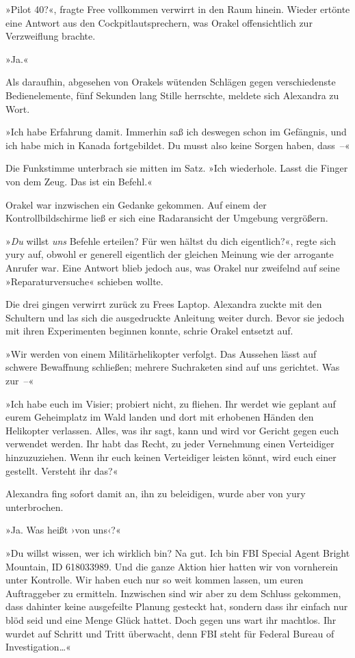 »Pilot 40?«, fragte Free vollkommen verwirrt in den Raum hinein. Wieder ertönte eine Antwort aus den Cockpitlautsprechern, was Orakel offensichtlich zur Verzweiflung brachte.

»Ja.«

Als daraufhin, abgesehen von Orakels wütenden Schlägen gegen verschiedenste Bedienelemente, fünf Sekunden lang Stille herrschte, meldete sich Alexandra zu Wort.

»Ich habe Erfahrung damit. Immerhin saß ich deswegen schon im Gefängnis, und ich habe mich in Kanada fortgebildet. Du musst also keine Sorgen haben, dass~–«

Die Funkstimme unterbrach sie mitten im Satz. »Ich wiederhole. Lasst die Finger von dem Zeug. Das ist ein Befehl.«

Orakel war inzwischen ein Gedanke gekommen. Auf einem der Kontrollbildschirme ließ er sich eine Radaransicht der Umgebung vergrößern.

»\textit{Du} willst \textit{uns} Befehle erteilen? Für wen hältst du dich eigentlich?«, regte sich yury auf, obwohl er generell eigentlich der gleichen Meinung wie der arrogante Anrufer war. Eine Antwort blieb jedoch aus, was Orakel nur zweifelnd auf seine »Reparaturversuche« schieben wollte.

Die drei gingen verwirrt zurück zu Frees Laptop. Alexandra zuckte mit den Schultern und las sich die ausgedruckte Anleitung weiter durch. Bevor sie jedoch mit ihren Experimenten beginnen konnte, schrie Orakel entsetzt auf.

»Wir werden von einem Militärhelikopter verfolgt. Das Aussehen lässt auf schwere Bewaffnung schließen; mehrere Suchraketen sind auf uns gerichtet. Was zur~–«

»Ich habe euch im Visier; probiert nicht, zu fliehen. Ihr werdet wie geplant auf eurem Geheimplatz im Wald landen und dort mit erhobenen Händen den Helikopter verlassen. Alles, was ihr sagt, kann und wird vor Gericht gegen euch verwendet werden. Ihr habt das Recht, zu jeder Vernehmung einen Verteidiger hinzuzuziehen. Wenn ihr euch keinen Verteidiger leisten könnt, wird euch einer gestellt. Versteht ihr das?«

Alexandra fing sofort damit an, ihn zu beleidigen, wurde aber von yury unterbrochen.

»Ja. Was heißt ›von uns‹?«

»Du willst wissen, wer ich wirklich bin? Na gut. Ich bin FBI Special Agent Bright Mountain, ID 618033989. Und die ganze Aktion hier hatten wir von vornherein unter Kontrolle. Wir haben euch nur so weit kommen lassen, um euren Auftraggeber zu ermitteln. Inzwischen sind wir aber zu dem Schluss gekommen, dass dahinter keine ausgefeilte Planung gesteckt hat, sondern dass ihr einfach nur blöd seid und eine Menge Glück hattet. Doch gegen uns wart ihr machtlos. Ihr wurdet auf Schritt und Tritt überwacht, denn FBI steht für Federal Bureau of Investigation…«

